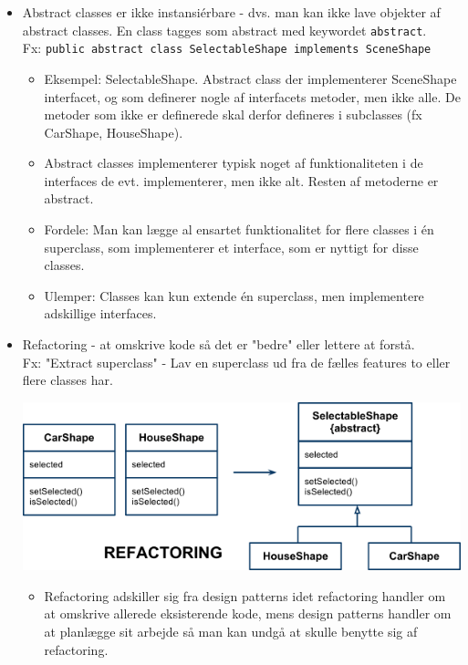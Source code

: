 \begin{itemize}
  \item Abstract classes er ikke instansiérbare - dvs. man kan ikke lave objekter af abstract classes. En class tagges som abstract med keywordet \verb|abstract|.\\
  Fx: \verb|public abstract class SelectableShape implements SceneShape|
  \begin{itemize}
    \item Eksempel: SelectableShape. Abstract class der implementerer SceneShape interfacet, og som definerer nogle af interfacets metoder, men ikke alle. De metoder som ikke er definerede skal derfor defineres i subclasses (fx CarShape, HouseShape).
    \item Abstract classes implementerer typisk noget af funktionaliteten i de interfaces de evt. implementerer, men ikke alt. Resten af metoderne er abstract.
    \item Fordele: Man kan lægge al ensartet funktionalitet for flere classes i én superclass, som implementerer et interface, som er nyttigt for disse classes.
    \item Ulemper: Classes kan kun extende én superclass, men implementere adskillige interfaces.
  \end{itemize}
  
  \item Refactoring - at omskrive kode så det er "bedre" eller lettere at forstå.\\
  Fx: "Extract superclass" - Lav en superclass ud fra de fælles features to eller flere classes har.
  
  \begin{center}
    \includegraphics[scale=0.6]{images/refactor_to_template_method_pattern.png}
  \end{center}

  \begin{itemize}
    \item Refactoring adskiller sig fra design patterns idet refactoring handler om at omskrive allerede eksisterende kode, mens design patterns handler om at planlægge sit arbejde så man kan undgå at skulle benytte sig af refactoring.
  \end{itemize}


\end{itemize}
